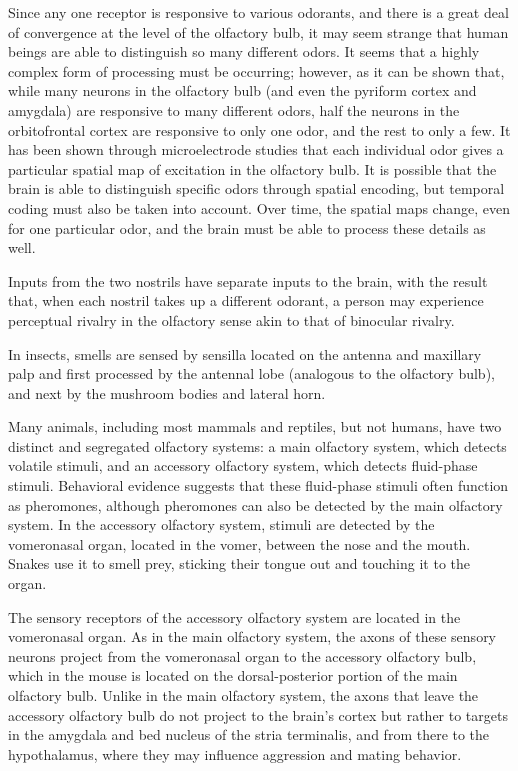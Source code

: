Since any one receptor is responsive to various odorants, and there is a
great deal of convergence at the level of the olfactory bulb, it may
seem strange that human beings are able to distinguish so many different
odors. It seems that a highly complex form of processing must be
occurring; however, as it can be shown that, while many neurons in the
olfactory bulb (and even the pyriform cortex and amygdala) are
responsive to many different odors, half the neurons in the
orbitofrontal cortex are responsive to only one odor, and the rest to
only a few. It has been shown through microelectrode studies that each
individual odor gives a particular spatial map of excitation in the
olfactory bulb. It is possible that the brain is able to distinguish
specific odors through spatial encoding, but temporal coding must also
be taken into account. Over time, the spatial maps change, even for one
particular odor, and the brain must be able to process these details as
well.

Inputs from the two nostrils have separate inputs to the brain, with the
result that, when each nostril takes up a different odorant, a person
may experience perceptual rivalry in the olfactory sense akin to that of
binocular rivalry.

In insects, smells are sensed by sensilla located on the antenna and
maxillary palp and first processed by the antennal lobe (analogous to
the olfactory bulb), and next by the mushroom bodies and lateral horn.

Many animals, including most mammals and reptiles, but not humans, have
two distinct and segregated olfactory systems: a main olfactory system,
which detects volatile stimuli, and an accessory olfactory system, which
detects fluid-phase stimuli. Behavioral evidence suggests that these
fluid-phase stimuli often function as pheromones, although pheromones
can also be detected by the main olfactory system. In the accessory
olfactory system, stimuli are detected by the vomeronasal organ, located
in the vomer, between the nose and the mouth. Snakes use it to smell
prey, sticking their tongue out and touching it to the organ.

The sensory receptors of the accessory olfactory system are located in
the vomeronasal organ. As in the main olfactory system, the axons of
these sensory neurons project from the vomeronasal organ to the
accessory olfactory bulb, which in the mouse is located on the
dorsal-posterior portion of the main olfactory bulb. Unlike in the main
olfactory system, the axons that leave the accessory olfactory bulb do
not project to the brain's cortex but rather to targets in the amygdala
and bed nucleus of the stria terminalis, and from there to the
hypothalamus, where they may influence aggression and mating behavior.

